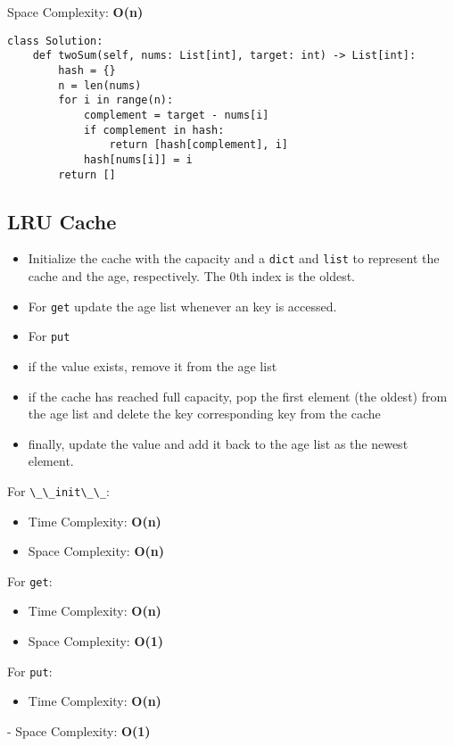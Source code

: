 \documentclass{article}
\begin{document}
Space Complexity: \textbf{O(n)}

\begin{lstlisting}
class Solution:
    def twoSum(self, nums: List[int], target: int) -> List[int]:
        hash = {}
        n = len(nums)
        for i in range(n):
            complement = target - nums[i]
            if complement in hash:
                return [hash[complement], i]
            hash[nums[i]] = i
        return []
\end{lstlisting}

\subsection{LRU Cache}
\begin{itemize}
\item Initialize the cache with the capacity and a \lstinline{dict} and \lstinline{list} to represent the cache and the age, respectively. The 0th index is the oldest.
\item For \lstinline{get} update the age list whenever an key is accessed.
\item For \lstinline{put}
\item if the value exists, remove it from the age list
\item if the cache has reached full capacity, pop the first element (the oldest) from the age list and delete the key corresponding key from the cache
\item finally, update the value and add it back to the age list as the newest element.
\end{itemize}

For \lstinline{\_\_init\_\_}:
\begin{itemize}
\item Time Complexity: \textbf{O(n)}
\item Space Complexity: \textbf{O(n)}
\end{itemize}

For \lstinline{get}:
\begin{itemize}
\item Time Complexity: \textbf{O(n)}
\item Space Complexity: \textbf{O(1)}
\end{itemize}

For \lstinline{put}:
\begin{itemize}
\item Time Complexity: \textbf{O(n)}
\end{itemize}
- Space Complexity: \textbf{O(1)}
\end{document}
